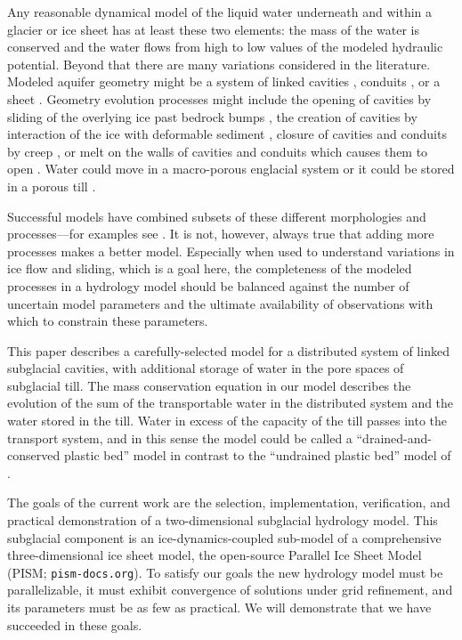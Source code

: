 \documentclass[gmd]{copernicus}   %
\begin{document}
\introduction

Any reasonable dynamical model of the liquid water underneath and within a glacier or ice sheet has at least these two elements: the mass of the water is conserved and the water flows from high to low values of the modeled hydraulic potential.  Beyond that there are many variations considered in the literature.  Modeled aquifer geometry might be a system of linked cavities \citep{Kamb1987}, conduits \citep{Nye1976}, or a sheet \citep{CreytsSchoof2009}.  Geometry evolution processes might include the opening of cavities by sliding of the overlying ice past bedrock bumps \citep{Schoof2005cavitation}, the creation of cavities by interaction of the ice with deformable sediment \citep{Schoof2007deformable}, closure of cavities and conduits by creep \citep{Hewitt2011}, or melt on the walls of cavities and conduits which causes them to open \citep{Clarke05}.  Water could move in a macro-porous englacial system \citep{Bartholomausetal2011,Harperetal2010} or it could be stored in a porous till \citep{Tulaczyketal2000}.

Successful models have combined subsets of these different morphologies and processes---for examples see \cite{FlowersClarke2002_theory,Hewitt2013,vanderWeletal2013,Werderetal2013,deFleurianetal2014}.  It is not, however, always true that adding more processes makes a better model.  Especially when used to understand variations in ice flow and sliding, which is a goal here, the completeness of the modeled processes in a hydrology model should be balanced against the number of uncertain model parameters and the ultimate availability of observations with which to constrain these parameters.

This paper describes a carefully-selected model for a distributed system of linked subglacial cavities, with additional storage of water in the pore spaces of subglacial till.  The mass conservation equation in our model describes the evolution of the sum of the transportable water in the distributed system and the water stored in the till.  Water in excess of the capacity of the till passes into the transport system, and in this sense the model could be called a ``drained-and-conserved plastic bed'' model in contrast to the ``undrained plastic bed'' model of \cite{Tulaczyketal2000b}.

The goals of the current work are the selection, implementation, verification, and practical demonstration of a two-dimensional subglacial hydrology model.  This subglacial component is an ice-dynamics-coupled sub-model of a comprehensive three-dimensional ice sheet model, the open-source Parallel Ice Sheet Model (PISM; \texttt{pism-docs.org}).  To satisfy our goals the new hydrology model must be parallelizable, it must exhibit convergence of solutions under grid refinement, and its parameters must be as few as practical.  We will demonstrate that we have succeeded in these goals.
\end{document}
